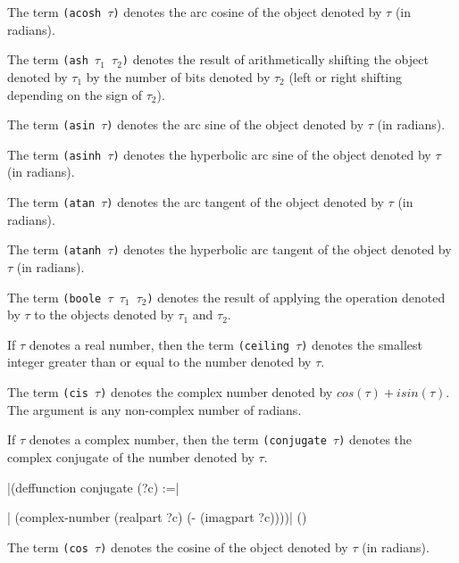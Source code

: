 {The term {\tt (acosh $\tau$)} denotes the arc cosine of the object denoted by $\tau$
(in radians).}

{The term {\tt (ash $\tau_1$ $\tau_2$)} denotes the result of arithmetically shifting
the object denoted by $\tau_1$ by the number of bits denoted by $\tau_2$ (left
or right shifting depending on the sign of $\tau_2$).}

{The term {\tt (asin $\tau$)} denotes the arc sine of the object denoted by $\tau$ (in
radians).}

{The term {\tt (asinh $\tau$)} denotes the hyperbolic arc sine of the object denoted by $\tau$ (in radians).}

{The term {\tt (atan $\tau$)} denotes the arc tangent of the object
denoted by $\tau$ (in radians).}

{The term {\tt (atanh $\tau$)} denotes the hyperbolic arc tangent of the object denoted by
$\tau$ (in radians).}

{The term {\tt (boole $\tau$ $\tau_1$ $\tau_2$)} denotes the result of applying
the operation denoted by $\tau$ to the objects denoted by $\tau_1$ and
$\tau_2$.} 

If $\tau$ denotes a real number, then the term {\tt (ceiling $\tau$)}
denotes the smallest integer greater than or equal to the number denoted
by $\tau$.

{The term {\tt (cis $\tau$)} denotes the complex number denoted by $cos(\tau) + i
sin(\tau)$. The argument is any non-complex number of radians.}

If $\tau$ denotes a complex number, then the term {\tt (conjugate
$\tau$)} denotes the complex conjugate of the number denoted by
$\tau$.

\medskip
\verbatim|(deffunction conjugate (?c) :=|\par
\verbatim|  (complex-number (realpart ?c) (- (imagpart ?c))))|
\hfill(\equation)\par
\medskip

{The term {\tt (cos $\tau$)} denotes the cosine of the object denoted by $\tau$ (in radians).}



